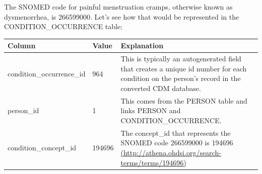 \documentclass[]{book}
\begin{document}
The SNOMED code for painful menstruation cramps, otherwise known as dysmenorrhea, is 266599000. Let's see how that would be represented in the CONDITION\_OCCURRENCE table:

\begin{longtable}[]{@{}lll@{}}
\toprule
\begin{minipage}[b]{0.27\columnwidth}\raggedright
Column\strut
\end{minipage} & \begin{minipage}[b]{0.14\columnwidth}\raggedright
Value\strut
\end{minipage} & \begin{minipage}[b]{0.50\columnwidth}\raggedright
Explanation\strut
\end{minipage}\tabularnewline
\midrule
\endhead
\begin{minipage}[t]{0.27\columnwidth}\raggedright
condition\_occurrence\_id\strut
\end{minipage} & \begin{minipage}[t]{0.14\columnwidth}\raggedright
964\strut
\end{minipage} & \begin{minipage}[t]{0.50\columnwidth}\raggedright
This is typically an autogenerated field that creates a unique id number for each condition on the person's record in the converted CDM database.\strut
\end{minipage}\tabularnewline
\begin{minipage}[t]{0.27\columnwidth}\raggedright
person\_id\strut
\end{minipage} & \begin{minipage}[t]{0.14\columnwidth}\raggedright
1\strut
\end{minipage} & \begin{minipage}[t]{0.50\columnwidth}\raggedright
This comes from the PERSON table and links PERSON and CONDITION\_OCCURRENCE.\strut
\end{minipage}\tabularnewline
\begin{minipage}[t]{0.27\columnwidth}\raggedright
condition\_concept\_id\strut
\end{minipage} & \begin{minipage}[t]{0.14\columnwidth}\raggedright
194696\strut
\end{minipage} & \begin{minipage}[t]{0.50\columnwidth}\raggedright
The concept\_id that represents the SNOMED code 266599000 is 194696 \href{http://athena.ohdsi.org/search-terms/terms/194696}{(http://athena.ohdsi.org/search-terms/terms/194696)}\strut

\end{minipage}
\end{longtable}
\end{document}
